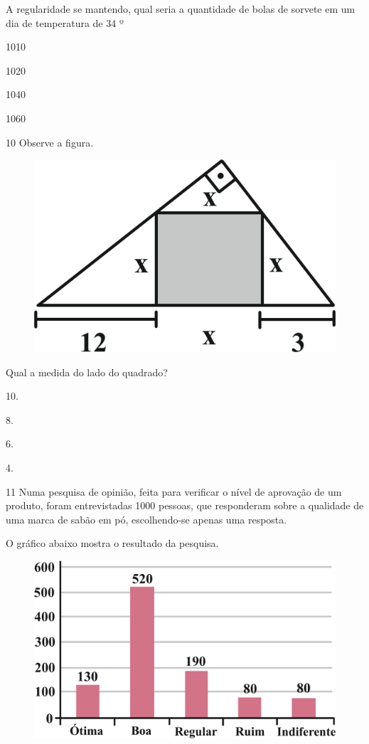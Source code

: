A regularidade se mantendo, qual seria a quantidade de bolas de sorvete
em um dia de temperatura de 34 º

\begin{escolha}
\item 1010

\item 1020

\item 1040

\item 1060
\end{escolha}


\pagebreak
\num{10} Observe a figura.

\begin{figure}[htpb!]
\centering
\includegraphics[width=.5\textwidth]{./ilustras-mat/Simulado_4-atividade_10_resposta.png}
\end{figure}

Qual a medida do lado do quadrado?

\begin{multicols}{2}
\begin{escolha}
\item 10.

\item 8.

\item 6.

\item 4.
\end{escolha}
\end{multicols}

\num{11} Numa pesquisa de opinião, feita para verificar o nível de aprovação
de um produto, foram entrevistadas 1000 pessoas, que responderam sobre a
qualidade de uma marca de sabão em pó, escolhendo-se apenas uma
resposta.

O gráfico abaixo mostra o resultado da pesquisa.

\begin{figure}[htpb!]
\centering
\includegraphics[width=.75\textwidth]{./ilustras-mat/Simulado_4-atividade_11.png}
\end{figure}

